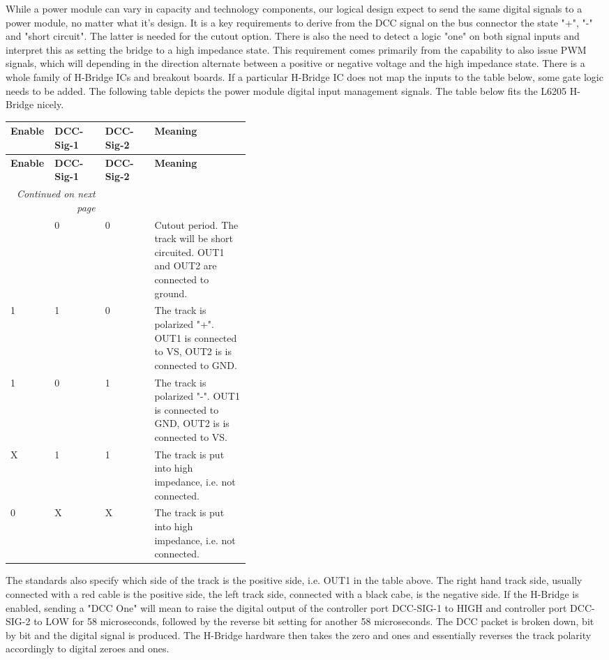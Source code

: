 While a power module can vary in capacity and technology components, our logical design expect to send the same digital signals to a power module, no matter what it's design. It is a key requirements to derive from the DCC signal on the bus connector the state "+", "-" and "short circuit". The latter is needed for the cutout option. There is also the need to detect a logic "one" on both signal inputs and interpret this as setting the bridge to a high impedance state. This requirement comes primarily from the capability to also issue PWM signals, which will depending in the direction alternate between a positive or negative voltage and the high impedance state. There is a whole family of H-Bridge ICs and breakout boards. If a particular H-Bridge IC does not map the inputs to the table below, some gate logic needs to be added. The following table depicts the power module digital input management signals. The table below fits the L6205 H-Bridge nicely.

\begin{longtable}{@{}|l|l|l|p{0.4\linewidth}|@{}}
    \toprule
    \textbf{Enable} & \textbf{DCC-Sig-1} & \textbf{DCC-Sig-2} & \textbf{Meaning} \\
    \midrule
    \endfirsthead
    \toprule
    \textbf{Enable} & \textbf{DCC-Sig-1} & \textbf{DCC-Sig-2} & \textbf{Meaning} \\
    \midrule
    \endhead
    \midrule
    \multicolumn{2}{r}{\textit{Continued on next page}} \\
    \midrule
    \endfoot
    \bottomrule
    \endlastfoot
    1 & 0 & 0 & Cutout period. The track will be short circuited. OUT1 and OUT2 are connected to ground. \\
    \midrule
    1 & 1 & 0 & The track is polarized "+". OUT1 is connected to VS, OUT2 is is connected to GND. \\
    \midrule
    1 & 0 & 1 & The track is polarized "-". OUT1 is connected to GND, OUT2 is is connected to VS. \\
    \midrule
    X & 1 & 1 & The track is put into high impedance, i.e. not connected. \\
    \midrule
    0 & X & X & The track is put into high impedance, i.e. not connected. \\
\end{longtable}

The standards also specify which side of the track is the positive side, i.e. OUT1 in the table above. The right hand track side, usually connected with a red cable is the positive side, the left track side, connected with a black cabe, is the negative side. If the H-Bridge is enabled, sending a "DCC One" will mean to raise the digital output of the controller port DCC-SIG-1 to HIGH and controller port DCC-SIG-2 to LOW for 58 microseconds, followed by the reverse bit setting for another 58 microseconds. The DCC packet is broken down, bit by bit and the digital signal is produced. The H-Bridge hardware then takes the zero and ones and essentially reverses the track polarity accordingly to digital zeroes and ones.

